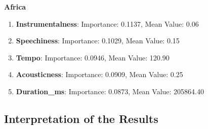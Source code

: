 \textbf{Africa}
\begin{enumerate}
    \item \textbf{Instrumentalness}: Importance: 0.1137, Mean Value: 0.06
    \item \textbf{Speechiness}: Importance: 0.1029, Mean Value: 0.15
    \item \textbf{Tempo}: Importance: 0.0946, Mean Value: 120.90
    \item \textbf{Acousticness}: Importance: 0.0909, Mean Value: 0.25
    \item \textbf{Duration\_ms}: Importance: 0.0873, Mean Value: 205864.40
\end{enumerate}

\newpage
\subsection{Interpretation of the Results}

